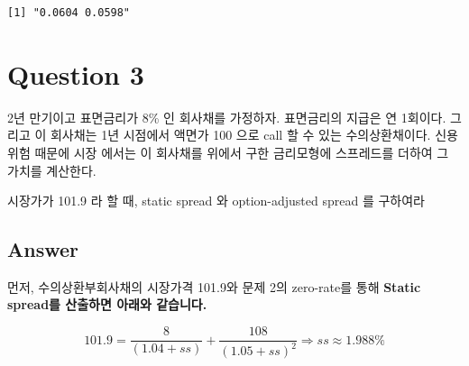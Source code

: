 \documentclass[
  a4paper,
  DIV=11,
  numbers=noendperiod]{scrreprt}
\begin{document}
\begin{verbatim}
[1] "0.0604 0.0598"
\end{verbatim}

\section*{Question 3}\label{question-3}


2년 만기이고 표면금리가 8\% 인 회사채를 가정하자. 표면금리의 지급은 연
1회이다. 그리고 이 회사채는 1년 시점에서 액면가 100 으로 call 할 수 있는
수의상환채이다. 신용위험 때문에 시장 에서는 이 회사채를 위에서 구한
금리모형에 스프레드를 더하여 그 가치를 계산한다.

시장가가 101.9 라 할 때, static spread 와 option-adjusted spread 를
구하여라

\subsection*{Answer}\label{answer-2}

먼저, 수의상환부회사채의 시장가격 101.9와 문제 2의 zero-rate를 통해
\textbf{Static spread를 산출하면 아래와 같습니다.}

\[101.9=\frac{8}{(1.04+ss)}+\frac{108}{(1.05+ss)^2}\Rightarrow ss\approx 1.988\%\]
\end{document}
